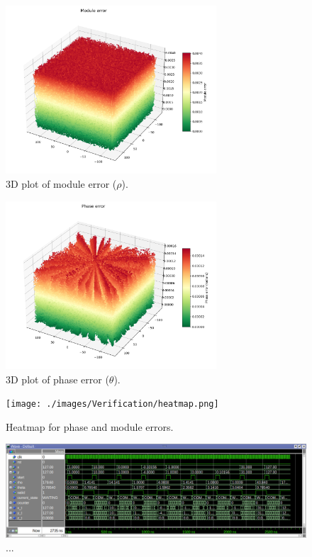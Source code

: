 \begin{figure}[!ht]
    \centering
    \includegraphics[width=0.7\textwidth]{./images/Verification/module_error.png}
    \caption{3D plot of module error (\( \rho \)).}
    \label{fig:module_error}
\end{figure}

\begin{figure}[!ht]
    \centering
    \includegraphics[width=0.7\textwidth]{./images/Verification/phase_error.png}
    \caption{3D plot of phase error (\( \theta \)).}
    \label{fig:phase_error}
\end{figure}

\begin{figure}[!ht]
    \centering
    \texttt{[image: ./images/Verification/heatmap.png]}
    \caption{Heatmap for phase and module errors.}
    \label{fig:heatmap_error}
\end{figure}



\begin{figure}[!ht]
    \centering
    \includegraphics[width=\textwidth]{./images/Verification/wavebig.png}
    \caption{...}
    \label{fig:wavebig}
\end{figure}


